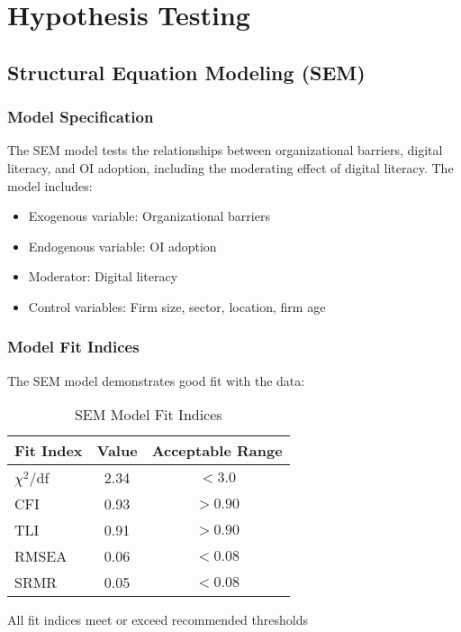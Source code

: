 \section{Hypothesis Testing}

\subsection{Structural Equation Modeling (SEM)}

\subsubsection{Model Specification}
The SEM model tests the relationships between organizational barriers, digital literacy, and OI adoption, including the moderating effect of digital literacy. The model includes:
\begin{itemize}
    \item Exogenous variable: Organizational barriers
    \item Endogenous variable: OI adoption
    \item Moderator: Digital literacy
    \item Control variables: Firm size, sector, location, firm age
\end{itemize}

\subsubsection{Model Fit Indices}
The SEM model demonstrates good fit with the data:

\begin{table}[H]
\centering
\caption{SEM Model Fit Indices}
\label{tab:sem_fit}
\begin{tabular}{@{}lcc@{}}
\toprule
\textbf{Fit Index} & \textbf{Value} & \textbf{Acceptable Range} \\
\midrule
$\chi^2$/df & 2.34 & $< 3.0$ \\
CFI & 0.93 & $> 0.90$ \\
TLI & 0.91 & $> 0.90$ \\
RMSEA & 0.06 & $< 0.08$ \\
SRMR & 0.05 & $< 0.08$ \\
\bottomrule
\end{tabular}
\begin{tablenotes}
\item All fit indices meet or exceed recommended thresholds \citep{hair2010multivariate}
\end{tablenotes}
\end{table}

